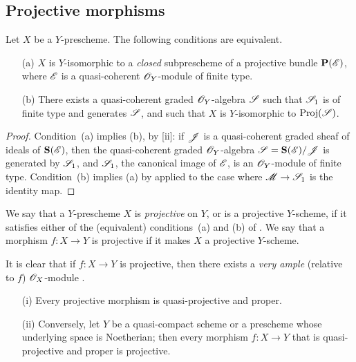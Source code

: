 \subsection{Projective morphisms}
\label{subsection:II.5.5}

\begin{proposition}[5.5.1]
\label{II.5.5.1}
Let $X$ be a $Y$-prescheme.
The following conditions are equivalent.
\begin{enumerate}
  \item[{\rm(a)}] $X$ is $Y$-isomorphic to a \emph{closed} subprescheme of a projective bundle $\mathbf{P}(\mathscr{E})$, where $\mathscr{E}$ is a quasi-coherent $\mathscr{O}_Y$-module of finite type.
  \item[{\rm(b)}] There exists a quasi-coherent graded $\mathscr{O}_Y$-algebra $\mathscr{S}$ such that $\mathscr{S}_1$ is of finite type and generates $\mathscr{S}$, and such that $X$ is $Y$-isomorphic to $\operatorname{Proj}(\mathscr{S})$.
\end{enumerate}
\end{proposition}

\begin{proof}
\label{proof-II.5.5.1}
Condition~(a) implies (b), by [ii]: if $\mathscr{J}$ is a quasi-coherent graded sheaf of ideals of $\mathbf{S}(\mathscr{E})$, then the quasi-coherent graded $\mathscr{O}_Y$-algebra $\mathscr{S}=\mathbf{S}(\mathscr{E})/\mathscr{J}$ is generated by $\mathscr{S}_1$, and $\mathscr{S}_1$, the canonical image of $\mathscr{E}$, is an $\mathscr{O}_Y$-module of finite type.
Condition~(b) implies (a) by  applied to the case where $\sh{M}\to\sh{S}_1$ is the identity map.
\end{proof}

\begin{definition}[5.5.2]
\label{II.5.5.2}
We say that a $Y$-prescheme $X$ is \emph{projective} on $Y$, or is a projective $Y$-scheme, if it satisfies either of the (equivalent) conditions~(a) and (b) of .
We say that a morphism $f:X\to Y$ is projective if it makes $X$ a projective $Y$-scheme.
\end{definition}

It is clear that if $f:X\to Y$ is projective, then there exists a \emph{very ample} (relative to $f$) $\mathscr{O}_X$-module .
\begin{theorem}[5.5.3]
\label{II.5.5.3}
\medskip\noindent
\begin{enumerate}
  \item[{\rm(i)}] Every projective morphism is quasi-projective and proper.
  \item[{\rm(ii)}] Conversely, let $Y$ be a quasi-compact scheme or a prescheme whose underlying space is Noetherian; then every morphism $f:X\to Y$ that is quasi-projective and proper is projective.
\end{enumerate}
\end{theorem}

